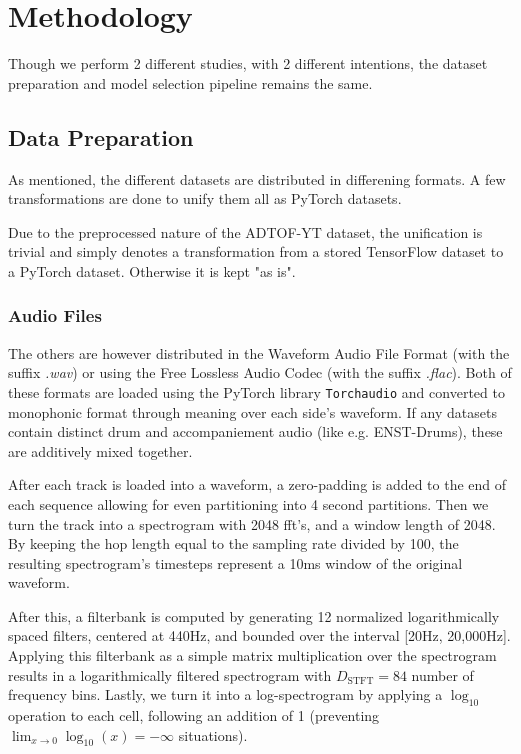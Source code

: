 \chapter{Methodology}\label{Methodology}

Though we perform 2 different studies, with 2 different intentions, the dataset preparation and model selection pipeline remains the same. 

\section{Data Preparation}

As mentioned, the different datasets are distributed in differening formats. A few transformations are done to unify them all as PyTorch datasets.

Due to the preprocessed nature of the ADTOF-YT dataset, the unification is trivial and simply denotes a transformation from a stored TensorFlow dataset to a PyTorch dataset. Otherwise it is kept "as is".

\subsection{Audio Files}

The others are however distributed in the Waveform Audio File Format (with the suffix \textit{.wav}) or using the Free Lossless Audio Codec (with the suffix \textit{.flac}). Both of these formats are loaded using the PyTorch library \texttt{Torchaudio} and converted to monophonic format through meaning over each side's waveform. If any datasets contain distinct drum and accompaniement audio (like e.g. ENST-Drums), these are additively mixed together.

After each track is loaded into a waveform, a zero-padding is added to the end of each sequence allowing for even partitioning into 4 second partitions. Then we turn the track into a spectrogram with 2048 fft's, and a window length of 2048. By keeping the hop length equal to the sampling rate divided by 100, the resulting spectrogram's timesteps represent a 10ms window of the original waveform.

After this, a filterbank is computed by generating 12 normalized logarithmically spaced filters, centered at 440Hz, and bounded over the interval [20Hz, 20,000Hz]. Applying this filterbank as a simple matrix multiplication over the spectrogram results in a logarithmically filtered spectrogram with $D_\text{STFT} = 84$ number of frequency bins. Lastly, we turn it into a log-spectrogram by applying a $\log_{10}$ operation to each cell, following an addition of 1 (preventing $\lim_{x \to 0}\log_{10}(x) = -\infty$ situations).

